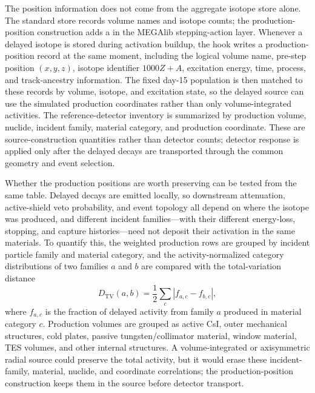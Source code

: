 \documentclass[11pt]{article}
\begin{document}
The position information does not come from the aggregate isotope store alone.
The standard store records volume names and isotope counts; the
production-position construction adds a  in the MEGAlib
stepping-action layer. Whenever a delayed isotope is stored during activation
buildup, the hook writes a production-position record at the same moment,
including the logical volume name, pre-step position $(x,y,z)$, isotope
identifier $1000Z+A$, excitation energy, time, process, and track-ancestry
information. The fixed day-15 population is then matched to these records by
volume, isotope, and excitation state, so the delayed source can use the
simulated production coordinates rather than only volume-integrated activities.
The reference-detector inventory is summarized by production volume, nuclide,
incident family, material category, and production coordinate. These are
source-construction quantities rather than detector counts; detector response is
applied only after the delayed decays are transported through the common geometry
and event selection.

Whether the production positions are worth preserving can be tested from the
same table. Delayed decays are emitted locally, so downstream attenuation,
active-shield veto probability, and event topology all depend on where the
isotope was produced, and different incident families---with their different
energy-loss, stopping, and capture histories---need not deposit their
activation in the same materials. To quantify this, the weighted production
rows are grouped by incident particle family and material category, and the
activity-normalized category distributions of two families $a$ and $b$ are
compared with the total-variation distance
\begin{equation}
  D_{\mathrm{TV}}(a,b) =
  \frac{1}{2}\sum_c \left| f_{a,c} - f_{b,c} \right| ,
\end{equation}
where $f_{a,c}$ is the fraction of delayed activity from family $a$ produced
in material category $c$. Production volumes are grouped as active CsI,
outer mechanical structures, cold plates, passive tungsten/collimator material,
window material, TES volumes, and other internal structures. A volume-integrated
or axisymmetric radial source could preserve the total
activity, but it would erase these incident-family, material, nuclide, and
coordinate correlations; the production-position construction keeps them in
the source before detector transport.
\end{document}
